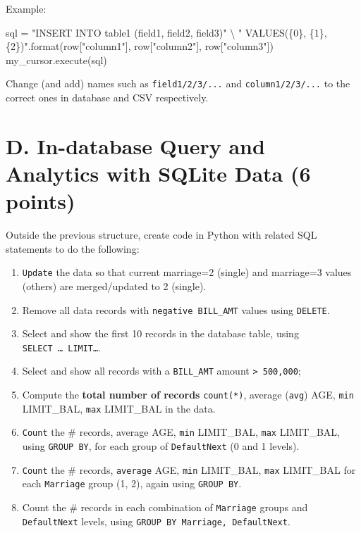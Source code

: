 \documentclass[
  letterpaper,
]{scrbook}
\newenvironment{Shaded}{\begin{snugshade}}{\end{snugshade}}
\newcommand{\BuiltInTok}[1]{\textcolor[rgb]{0.00,0.23,0.31}{#1}}
\newcommand{\NormalTok}[1]{\textcolor[rgb]{0.00,0.23,0.31}{#1}}
\newcommand{\OperatorTok}[1]{\textcolor[rgb]{0.37,0.37,0.37}{#1}}
\newcommand{\SpecialCharTok}[1]{\textcolor[rgb]{0.37,0.37,0.37}{#1}}
\newcommand{\StringTok}[1]{\textcolor[rgb]{0.13,0.47,0.30}{#1}}
\begin{document}
Example:

\begin{Shaded}
\begin{Highlighting}[]
\NormalTok{sql }\OperatorTok{=} \StringTok{"INSERT INTO table1 (field1, field2, field3)"} \OperatorTok{\textbackslash{}}
        \StringTok{" VALUES(}\SpecialCharTok{\{0\}}\StringTok{, \textquotesingle{}}\SpecialCharTok{\{1\}}\StringTok{\textquotesingle{}, }\SpecialCharTok{\{2\}}\StringTok{)"}\NormalTok{.}\BuiltInTok{format}\NormalTok{(row[}\StringTok{"column1"}\NormalTok{], row[}\StringTok{"column2"}\NormalTok{], row[}\StringTok{"column3"}\NormalTok{])}
\NormalTok{my\_cursor.execute(sql)}
\end{Highlighting}
\end{Shaded}

Change (and add) names such as \texttt{field1/2/3/...} and
\texttt{column1/2/3/...} to the correct ones in database and CSV
respectively.

\section*{D. In-database Query and Analytics with SQLite Data (6
points)}\label{d.-in-database-query-and-analytics-with-sqlite-data-6-points}


Outside the previous structure, create code in Python with related SQL
statements to do the following:

\begin{enumerate}
\def\labelenumi{\arabic{enumi}.}
\item
  \texttt{Update} the data so that current marriage=2 (single) and
  marriage=3 values (others) are merged/updated to 2 (single).
\item
  Remove all data records with \texttt{negative\ BILL\_AMT} values using
  \texttt{DELETE}.
\item
  Select and show the first 10 records in the database table, using
  \texttt{SELECT\ …\ LIMIT…}.
\item
  Select and show all records with a \texttt{BILL\_AMT} amount
  \texttt{\textgreater{}\ 500,000};
\item
  Compute the \textbf{total number of records} \texttt{count(*)},
  average (\texttt{avg}) AGE, \texttt{min} LIMIT\_BAL, \texttt{max}
  LIMIT\_BAL in the data.
\item
  \texttt{Count} the \# records, average AGE, \texttt{min} LIMIT\_BAL,
  \texttt{max} LIMIT\_BAL, using \texttt{GROUP\ BY}, for each group of
  \texttt{DefaultNext} (0 and 1 levels).
\item
  \texttt{Count} the \# records, \texttt{average} AGE, \texttt{min}
  LIMIT\_BAL, \texttt{max} LIMIT\_BAL for each \texttt{Marriage} group
  (1, 2), again using \texttt{GROUP\ BY}.
\item
  Count the \# records in each combination of \texttt{Marriage} groups
  and \texttt{DefaultNext} levels, using
  \texttt{GROUP\ BY\ Marriage,\ DefaultNext}.
\end{enumerate}
\end{document}
